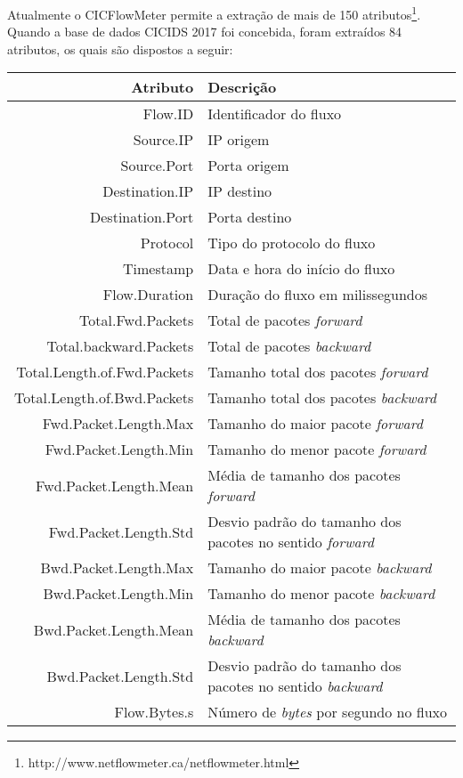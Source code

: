 Atualmente o CICFlowMeter permite a extração de mais de 150 atributos\footnote{http://www.netflowmeter.ca/netflowmeter.html}. Quando a base de dados CICIDS 2017 foi concebida, foram extraídos 84 atributos, os quais são dispostos a seguir:

\begin{longtable}{r|p{10.5cm}}
\hline
\centering
    \textbf{Atributo}  & \textbf{Descrição}   \\
    \hline
    Flow.ID & Identificador do fluxo \\
    Source.IP & IP origem \\
    Source.Port & Porta origem \\
    Destination.IP & IP destino \\
    Destination.Port & Porta destino \\
    Protocol & Tipo do protocolo do fluxo \\
    Timestamp & Data e hora do início do fluxo \\
    Flow.Duration & Duração do fluxo em milissegundos \\
    Total.Fwd.Packets & Total de pacotes \textit{forward} \\
    Total.backward.Packets & Total de pacotes \textit{backward} \\
    Total.Length.of.Fwd.Packets & Tamanho total dos pacotes \textit{forward} \\
    Total.Length.of.Bwd.Packets & Tamanho total dos pacotes \textit{backward} \\
    Fwd.Packet.Length.Max & Tamanho do maior pacote \textit{forward} \\
    Fwd.Packet.Length.Min & Tamanho do menor pacote \textit{forward} \\
    Fwd.Packet.Length.Mean & Média de tamanho dos pacotes \textit{forward} \\
    Fwd.Packet.Length.Std & Desvio padrão do tamanho dos pacotes no sentido \textit{forward} \\
    Bwd.Packet.Length.Max & Tamanho do maior pacote \textit{backward} \\
    Bwd.Packet.Length.Min & Tamanho do menor pacote \textit{backward} \\
    Bwd.Packet.Length.Mean & Média de tamanho dos pacotes \textit{backward} \\
    Bwd.Packet.Length.Std & Desvio padrão do tamanho dos pacotes no sentido \textit{backward} \\
    Flow.Bytes.s & Número de \textit{bytes} por segundo no fluxo \\

\end{longtable}
